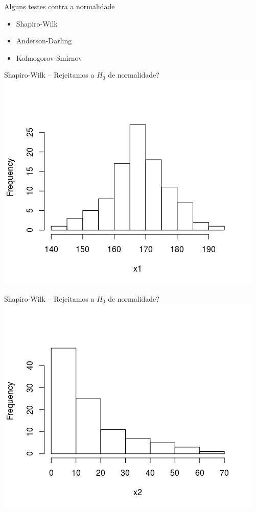 \documentclass{beamer}
\begin{document}
\begin{frame}{Alguns testes contra a normalidade}
  \begin{itemize}
  \item<1-> \alert<2>{Shapiro-Wilk}
    \bigskip
  \item<1-> Anderson-Darling
    \bigskip
  \item<1-> Kolmogorov-Smirnov
  \end{itemize}
\end{frame}

\begin{frame}{\small Shapiro-Wilk -- Rejeitamos a $H_0$ de normalidade?}
  \centering
  \includegraphics[width=.8\textwidth]{Cap37-38/normal1-h}

  \footnotesize
\end{frame}


\begin{frame}{\small Shapiro-Wilk -- Rejeitamos a $H_0$ de normalidade?}
  \centering
  \includegraphics[width=.8\textwidth]{Cap37-38/lognormal1-h}

  \footnotesize
\end{frame}
\end{document}
